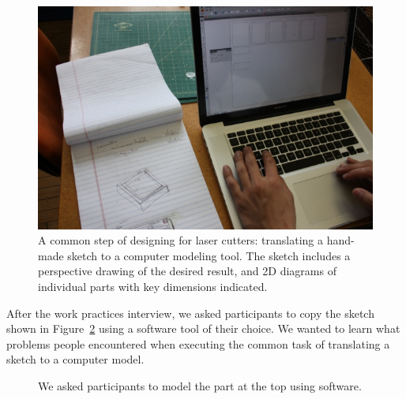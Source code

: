 \documentclass{article}
\begin{document}
\begin{figure}[h]
  \centering
  \includegraphics[width=0.9\linewidth]{img/translate-sketch-to-computer.jpg}
  \caption{A common step of designing for laser cutters: translating a
    hand-made sketch to a computer modeling tool. The sketch includes
    a perspective drawing of the desired result, and 2D diagrams of
    individual parts with key dimensions indicated.}
  \label{fig:translate}
\end{figure}

After the work practices interview, we asked participants to copy the
sketch shown in Figure~\ref{fig:interview-sketch} using a software
tool of their choice. We wanted to learn what problems people
encountered when executing the common task of translating a sketch to
a computer model.

\begin{figure}[h]
\centering {}

\caption{We asked participants to model the part at the top using
  software.}
\label{fig:interview-sketch}
\end{figure}
\end{document}
